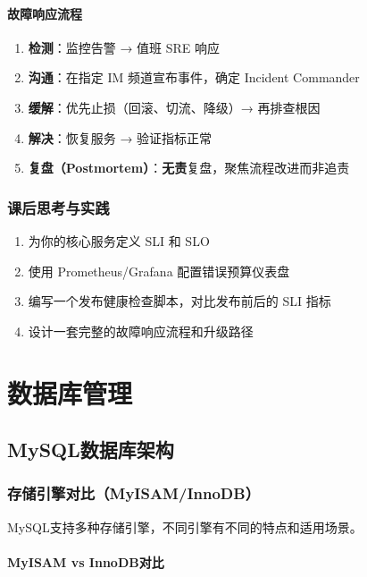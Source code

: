 \documentclass[12pt,UTF8]{ctexbook}
\begin{document}
\subsection*{故障响应流程}

\begin{enumerate}
    \item \textbf{检测}：监控告警 → 值班 SRE 响应
    \item \textbf{沟通}：在指定 IM 频道宣布事件，确定 Incident Commander
    \item \textbf{缓解}：优先止损（回滚、切流、降级）→ 再排查根因
    \item \textbf{解决}：恢复服务 → 验证指标正常
    \item \textbf{复盘（Postmortem）}：\textbf{无责}复盘，聚焦流程改进而非追责
\end{enumerate}

\section{课后思考与实践}
\label{sec:sre-practice}
\begin{enumerate}
    \item 为你的核心服务定义 SLI 和 SLO
    \item 使用 Prometheus/Grafana 配置错误预算仪表盘
    \item 编写一个发布健康检查脚本，对比发布前后的 SLI 指标
    \item 设计一套完整的故障响应流程和升级路径
\end{enumerate}

\part{数据库管理}

\chapter{MySQL数据库架构}
\label{chap:mysql-architecture}

\section{存储引擎对比（MyISAM/InnoDB）}
\label{sec:storage-engines}

MySQL支持多种存储引擎，不同引擎有不同的特点和适用场景。

\subsection*{MyISAM vs InnoDB对比}
\end{document}
